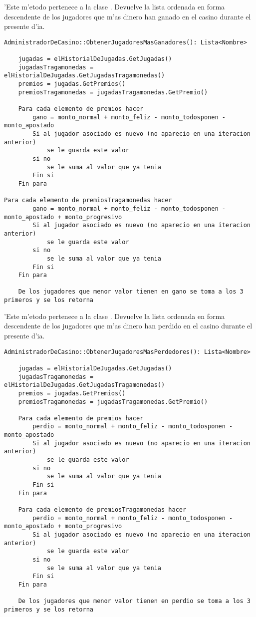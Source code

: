 
'Este m'etodo pertenece a la clase . Devuelve la lista ordenada en forma descendente de los jugadores que m'as dinero han ganado en el casino durante el presente d'ia.

\begin{verbatim}
AdministradorDeCasino::ObtenerJugadoresMasGanadores(): Lista<Nombre>
	
	jugadas = elHistorialDeJugadas.GetJugadas()
	jugadasTragamonedas = elHistorialDeJugadas.GetJugadasTragamonedas()
	premios = jugadas.GetPremios()
	premiosTragamonedas = jugadasTragamonedas.GetPremio()

	Para cada elemento de premios hacer
		gano = monto_normal + monto_feliz - monto_todosponen - monto_apostado
		Si al jugador asociado es nuevo (no aparecio en una iteracion anterior)
			se le guarda este valor
		si no
			se le suma al valor que ya tenia
		Fin si
	Fin para

Para cada elemento de premiosTragamonedas hacer
		gano = monto_normal + monto_feliz - monto_todosponen - monto_apostado + monto_progresivo
		Si al jugador asociado es nuevo (no aparecio en una iteracion anterior)
			se le guarda este valor
		si no
			se le suma al valor que ya tenia
		Fin si
	Fin para

	De los jugadores que menor valor tienen en gano se toma a los 3 primeros y se los retorna
\end{verbatim}



'Este m'etodo pertenece a la clase . Devuelve la lista ordenada en forma descendente de los jugadores que m'as dinero han perdido en el casino durante el presente d'ia.

\begin{verbatim}
AdministradorDeCasino::ObtenerJugadoresMasPerdedores(): Lista<Nombre>
	
	jugadas = elHistorialDeJugadas.GetJugadas()
	jugadasTragamonedas = elHistorialDeJugadas.GetJugadasTragamonedas()
	premios = jugadas.GetPremios()
	premiosTragamonedas = jugadasTragamonedas.GetPremio()

	Para cada elemento de premios hacer
		perdio = monto_normal + monto_feliz - monto_todosponen - monto_apostado
		Si al jugador asociado es nuevo (no aparecio en una iteracion anterior)
			se le guarda este valor
		si no
			se le suma al valor que ya tenia
		Fin si
	Fin para

	Para cada elemento de premiosTragamonedas hacer
		perdio = monto_normal + monto_feliz - monto_todosponen - monto_apostado + monto_progresivo
		Si al jugador asociado es nuevo (no aparecio en una iteracion anterior)
			se le guarda este valor
		si no
			se le suma al valor que ya tenia
		Fin si
	Fin para

	De los jugadores que menor valor tienen en perdio se toma a los 3 primeros y se los retorna
\end{verbatim}


